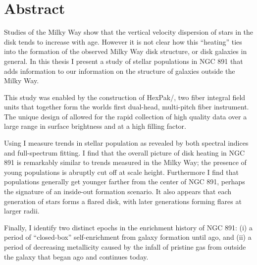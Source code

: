 \chapter*{Abstract}
\vspace{-0.5in}
Studies of the Milky Way show that the vertical velocity dispersion of
stars in the disk tends to increase with age. However it is not clear
how this ``heating'' ties into the formation of the observed Milky Way
disk structure, or disk galaxies in general. In this thesis I present
a study of stellar populations in NGC 891 that adds information to our
information on the structure of galaxies outside the Milky Way.

This study was enabled by the construction of HexPak/\GP, two fiber
integral field units that together form the worlds first dual-head,
multi-pitch fiber instrument. The unique design of \GP allowed for the
rapid collection of high quality data over a large range in surface
brightness and at a high filling factor.

Using \GP I measure trends in stellar population as revealed by both
spectral indices and full-spectrum fitting. I find that the overall
picture of disk heating in NGC 891 is remarkably similar to trends
measured in the Milky Way; the presence of young populations is
abruptly cut off at  scale height. Furthermore I find that
populations generally get younger farther from the center of NGC 891,
perhaps the signature of an inside-out formation scenario. It also
appears that each generation of stars forms a flared disk, with later
generations forming flares at larger radii.

Finally, I identify two distinct epochs in the enrichment history of
NGC 891: (i) a period of ``closed-box'' self-enrichment from galaxy
formation until  ago, and (ii) a period of
decreasing metallicity caused by the infall of pristine gas from
outside the galaxy that began  ago and continues today.
